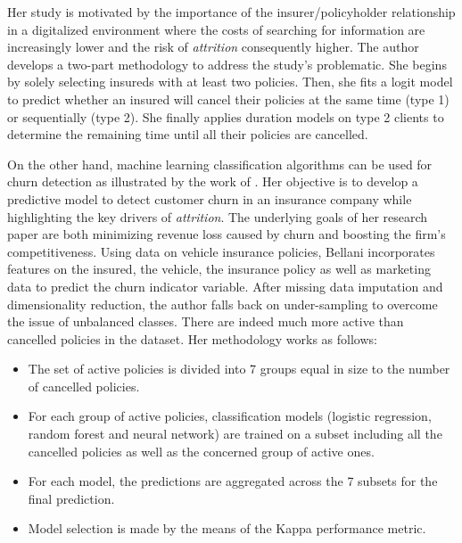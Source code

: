 \documentclass[
]{book}
\providecommand{\tightlist}{%
  \setlength{\itemsep}{0pt}\setlength{\parskip}{0pt}}
\begin{document}
Her study is motivated by the importance of the insurer/policyholder relationship in a digitalized environment where the costs of searching for information are increasingly lower and the risk of \emph{attrition} consequently higher. The author develops a two-part methodology to address the study's problematic. She begins by solely selecting insureds with at least two policies. Then, she fits a logit model to predict whether an insured will cancel their policies at the same time (type 1) or sequentially (type 2). She finally applies duration models on type 2 clients to determine the remaining time until all their policies are cancelled.

On the other hand, machine learning classification algorithms can be used for churn detection as illustrated by the work of \citet{CHURN_INSURANCE}. Her objective is to develop a predictive model to detect customer churn in an insurance company while highlighting the key drivers of \emph{attrition}. The underlying goals of her research paper are both minimizing revenue loss caused by churn and boosting the firm's competitiveness. Using data on vehicle insurance policies, Bellani incorporates features on the insured, the vehicle, the insurance policy as well as marketing data to predict the churn indicator variable. After missing data imputation and dimensionality reduction, the author falls back on under-sampling to overcome the issue of unbalanced classes. There are indeed much more active than cancelled policies in the dataset. Her methodology works as follows:

\begin{itemize}
\tightlist
\item
  The set of active policies is divided into 7 groups equal in size to the number of cancelled policies.
\item
  For each group of active policies, classification models (logistic regression, random forest and neural network) are trained on a subset including all the cancelled policies as well as the concerned group of active ones.
\item
  For each model, the predictions are aggregated across the 7 subsets for the final prediction.
\item
  Model selection is made by the means of the Kappa performance metric.
\end{itemize}
\end{document}

